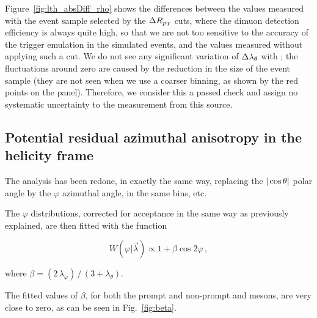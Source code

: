 Figure~\ref{fig:lth_absDiff_rho} shows the differences between the \lth values
measured with the event sample selected by the $\Delta R_{p_\text{T}}$ cuts,
where the dimuon detection efficiency is always quite high, 
so that we are not too sensitive to the accuracy of the trigger emulation in the simulated events,
and the values measured without applying such a cut.
We do not see any significant variation of $\Delta \lambda_\theta$ with \pt; 
the fluctuations around zero are caused by the reduction in the size of the event sample
(they are not seen when we use a coarser \pt binning, as shown by the red points on the \jpsi panel).
Therefore, we consider this a passed check and assign no systematic uncertainty
to the measurement from this source.

\vfill\newpage

\subsection{Potential residual azimuthal anisotropy in the helicity frame}

The analysis has been redone, in exactly the same way,
replacing the $|\cos\theta|$ polar angle by the $\varphi$ azimuthal angle,
in the same \pt bins, etc.

The $\varphi$ distributions, 
corrected for acceptance in the same way as previously explained, 
are then fitted with the function

\begin{equation}
W(\varphi|\vec{\lambda}) \propto 1 + \beta\cos2\varphi \, ,
\end{equation}

where $\beta = (2 \, \lambda_\varphi) \, / \, (3+\lambda_\theta)$.

The fitted values of $\beta$, for both the prompt and non-prompt \jpsi and \psip mesons,
are very close to zero, as can be seen in Fig.~\ref{fig:beta}.

